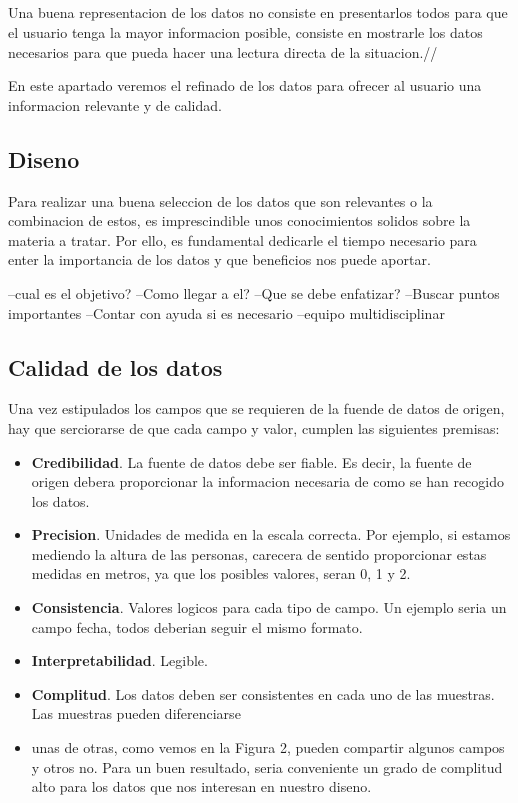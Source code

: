 \subsection*{}
Una buena representacion de los datos no consiste en presentarlos todos para que el usuario tenga la mayor informacion posible,
consiste en mostrarle los datos necesarios para que pueda hacer una lectura directa de la situacion.//

En este apartado veremos el refinado de los datos para ofrecer al usuario una informacion relevante y de calidad.

\subsection{Diseno}
Para realizar una buena seleccion de los datos que son relevantes o la combinacion de estos, es imprescindible unos 
conocimientos solidos sobre la materia a tratar. Por ello, es fundamental dedicarle el tiempo necesario para enter la
importancia de los datos y que beneficios nos puede aportar.

--cual es el objetivo?
--Como llegar a el?
--Que se debe enfatizar?
--Buscar puntos importantes
--Contar con ayuda si es necesario
--equipo multidisciplinar


\subsection{Calidad de los datos}

Una vez estipulados los campos que se requieren de la fuende de datos de origen, hay que serciorarse de que 
cada campo y valor, cumplen las siguientes premisas:
    \begin{itemize}
        \item \textbf{Credibilidad}. La fuente de datos debe ser fiable. Es decir, la fuente de origen debera
         proporcionar la informacion necesaria de como se han recogido los datos.
        \item \textbf{Precision}. Unidades de medida en la escala correcta. Por ejemplo, si estamos mediendo la altura
        de las personas, carecera de sentido proporcionar estas medidas en metros, ya que los posibles valores, seran 0, 1 y 2.
        \item \textbf{Consistencia}. Valores logicos para cada tipo de campo. Un ejemplo seria un campo fecha, todos deberian
        seguir el mismo formato.
        \item \textbf{Interpretabilidad}. Legible. 
        \item \textbf{Complitud}. Los datos deben ser consistentes en cada uno de las muestras. Las muestras pueden diferenciarse
        \item unas de otras, como vemos en la Figura 2, pueden compartir algunos campos y otros no. Para un buen resultado, seria 
        conveniente un grado de complitud alto para los datos que nos interesan en nuestro diseno.
    \end{itemize}

